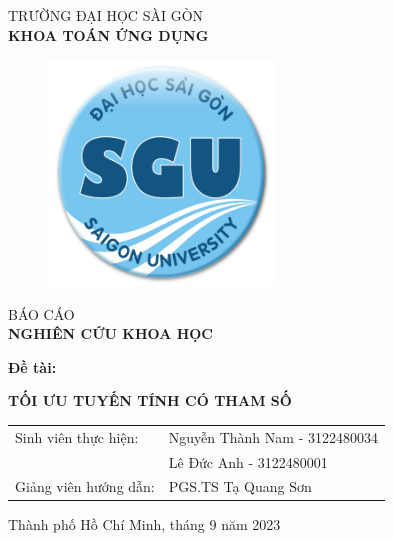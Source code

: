 \documentclass{article} %
\begin{document}
\begin{titlepage}
\begin{center}
\vspace{-15pt} TRƯỜNG ĐẠI HỌC SÀI GÒN\\
\textbf{\fontsize{16pt}{0pt}\selectfont KHOA TOÁN ỨNG DỤNG}
\vspace{0.5cm}
\begin{figure}[H]
    \centering
    \includegraphics[width=6cm,height=6cm]{bianckh.png}
\end{figure}
\vspace{1.5cm}
\fontsize{24pt}{0pt}\selectfont BÁO CÁO\\
\vspace{12pt}
\textbf{\fontsize{32pt}{0pt}\selectfont NGHIÊN CỨU KHOA HỌC}
\vspace{1.5cm}
\end{center}
\hspace{20pt}\textbf{\fontsize{14pt}{0pt}\selectfont Đề tài:}
\begin{center}
\textbf{\fontsize{20pt}{0pt}\selectfont TỐI ƯU TUYẾN TÍNH CÓ THAM SỐ} 
\vspace{1cm}
\begin{table}[H]
    \centering
    \begin{tabular}{l l}
\fontsize{14pt}{0pt}\selectfont Sinh viên thực hiện:     & \fontsize{14pt}{0pt}\selectfont Nguyễn Thành Nam - 3122480034 \vspace{6pt}\\     
                                                         & \fontsize{14pt}{0pt}\selectfont Lê Đức Anh - 3122480001 \vspace{6pt}\\
\fontsize{14pt}{0pt}\selectfont Giảng viên hướng dẫn: & \fontsize{14pt}{0pt}\selectfont PGS.TS Tạ Quang Sơn
\end{tabular}
\end{table}
\vspace{1.5cm}
\fontsize{14pt}{0pt}\selectfont Thành phố Hồ Chí Minh, tháng 9 năm 2023
\end{center}
\end{titlepage}
\end{document}
